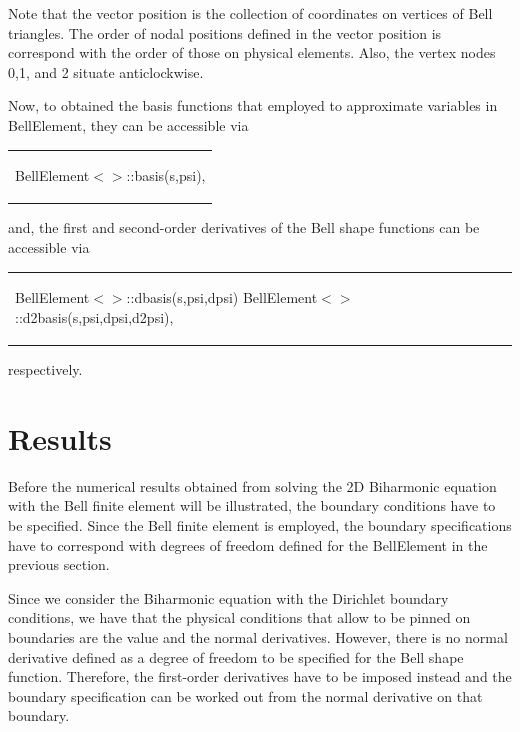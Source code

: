 Note that the vector {\ttfamily position} is the collection of coordinates on vertices of Bell triangles. The order of nodal positions defined in the vector {\ttfamily position} is correspond with the order of those on physical elements. Also, the vertex nodes 0,1, and 2 situate anticlockwise.

Now, to obtained the basis functions that employed to approximate variables in {\ttfamily Bell\+Element}, they can be accessible via

\begin{center} \tabulinesep=1mm
\begin{longtabu} spread 0pt [c]{*{1}{|X[-1]}|}
\hline
\begin{center} {\ttfamily Bell\+Element$<$$>$\+::basis(s,psi)}, \end{center}    \\
\end{longtabu}
\end{center} 

and, the first and second-\/order derivatives of the Bell shape functions can be accessible via

\begin{center} \tabulinesep=1mm
\begin{longtabu} spread 0pt [c]{*{1}{|X[-1]}|}
\hline
\begin{center} {\ttfamily Bell\+Element$<$$>$\+::dbasis(s,psi,dpsi)} {\ttfamily Bell\+Element$<$$>$\+::d2basis(s,psi,dpsi,d2psi)}, \end{center}    \\
\end{longtabu}
\end{center}  respectively.



 

\hypertarget{index_reslt}{}\section{Results}\label{index_reslt}
Before the numerical results obtained from solving the 2D Biharmonic equation with the Bell finite element will be illustrated, the boundary conditions have to be specified. Since the Bell finite element is employed, the boundary specifications have to correspond with degrees of freedom defined for the {\ttfamily Bell\+Element} in the previous section.

Since we consider the Biharmonic equation with the Dirichlet boundary conditions, we have that the physical conditions that allow to be pinned on boundaries are the value and the normal derivatives. However, there is no normal derivative defined as a degree of freedom to be specified for the Bell shape function. Therefore, the first-\/order derivatives have to be imposed instead and the boundary specification can be worked out from the normal derivative on that boundary.

